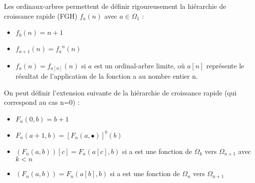 \documentclass[12pt]{beamer}
\begin{document}
\begin{frame}

Les ordinaux-arbres permettent de définir rigoureusement la hiérarchie de croissance rapide (FGH)  \( f_a(n) \) avec \( a \in \Omega_1 \) :

\begin{itemize}
     \setlength{\itemsep}{1pt}
     \setlength{\parskip}{0pt}
     \setlength{\parsep}{0pt}
\item \( f_0(n) = n+1 \)
\item \( f_{a+1}(n) = {f_a}^n(n) \)
\item \( f_a(n) = f_{a[n]}(n) \) si \( a \) est un ordinal-arbre limite, où  \( a[n] \) représente le résultat de l'application de la fonction a au nombre entier n. 

\end{itemize}

On peut définir l'extension suivante de la hiérarchie de croissance rapide (qui correspond au cas n=0) :

\begin{itemize}
     \setlength{\itemsep}{1pt}
     \setlength{\parskip}{0pt}
     \setlength{\parsep}{0pt}
\item \( F_n(0,b) = b+1 \)
\item \( F_n(a+1,b) = [F_n(a,\bullet)]^b(b) \)
\item \( (F_n(a,b))[c] = F_n(a[c],b) \) si a est une fonction de \( \Omega_k \) vers \( \Omega_{n+1} \) avec \( k < n \)
\item \( (F_n(a,b)) = F_n(a[b],b) \) si a est une fonction de \( \Omega_n \) vers \( \Omega_{n+1} \)
\end{itemize}

\end{frame}
\end{document}
